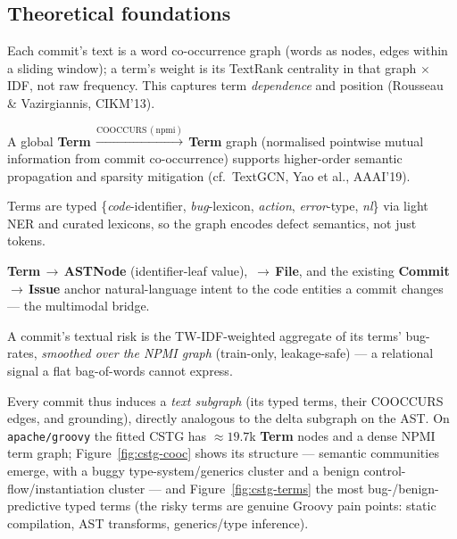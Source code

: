 \documentclass[11pt,a4paper]{article}
\newcommand{\node}[1]{\textcolor{kgblue}{\textbf{#1}}}
\begin{document}
	\subsection{Theoretical foundations}
	\begin{description}[nosep,leftmargin=1.4em]
		\item[Graph-of-Words / TW-IDF.] Each commit's text is a word co-occurrence graph
		(words as nodes, edges within a sliding window); a term's weight is its TextRank
		centrality in that graph $\times$ IDF, not raw frequency. This captures term
		\emph{dependence} and position (Rousseau \& Vazirgiannis, CIKM'13).
		\item[Corpus term graph via NPMI.] A global
		\node{Term}\,$\xrightarrow{\text{COOCCURS}\,(\text{npmi})}$\,\node{Term} graph
		(normalised pointwise mutual information from commit co-occurrence) supports
		higher-order semantic propagation and sparsity mitigation (cf.\ TextGCN, Yao et
		al., AAAI'19).
		\item[Defect-semantic typing.] Terms are typed
		\{\emph{code}-identifier, \emph{bug}-lexicon, \emph{action}, \emph{error}-type,
		\emph{nl}\} via light NER and curated lexicons, so the graph encodes defect
		semantics, not just tokens.
		\item[Cross-modal grounding.] \node{Term}\,$\rightarrow$\,\node{ASTNode}
		(identifier-leaf value), \,$\rightarrow$\,\node{File}, and the existing
		\node{Commit}\,$\rightarrow$\,\node{Issue} anchor natural-language intent to the
		code entities a commit changes --- the multimodal bridge.
		\item[Term-risk propagation.] A commit's textual risk is the TW-IDF-weighted
		aggregate of its terms' bug-rates, \emph{smoothed over the NPMI graph}
		(train-only, leakage-safe) --- a relational signal a flat bag-of-words cannot
		express.
	\end{description}
	Every commit thus induces a \emph{text subgraph} (its typed terms, their COOCCURS
	edges, and grounding), directly analogous to the delta subgraph on the AST. On
	\texttt{apache/groovy} the fitted CSTG has $\approx$$19.7$k \node{Term} nodes and a
	dense NPMI term graph; Figure~\ref{fig:cstg-cooc} shows its structure --- semantic
	communities emerge, with a buggy type-system/generics cluster and a benign
	control-flow/instantiation cluster --- and Figure~\ref{fig:cstg-terms} the
	most bug-/benign-predictive typed terms (the risky terms are genuine Groovy
	pain points: static compilation, AST transforms, generics/type inference).
\end{document}

